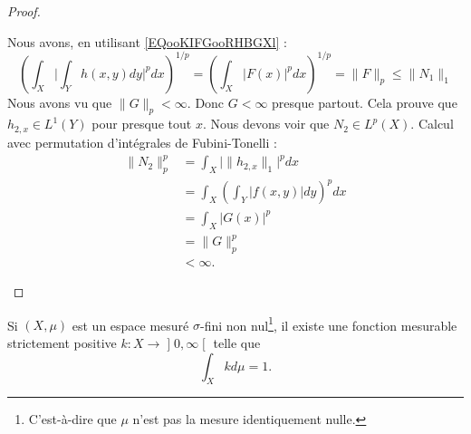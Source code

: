 \begin{proof}
\begin{subproof}
\begin{subproof}
			Nous avons, en utilisant \ref{EQooKIFGooRHBGXl} :
			\begin{equation}
				\left(  \int_X\big| \int_Yh(x,y)dy \big|^pdx   \right)^{1/p}=\left( \int_X| F(x) |^pdx \right)^{1/p}=\| F \|_p\leq \| N_1 \|_1
			\end{equation}
			Nous avons vu que \( \| G \|_p<\infty\). Donc \( G<\infty\) presque partout. Cela prouve que \( h_{2,x}\in L^1(Y)\) pour presque tout \( x\).
			Nous devons voir que \( N_2\in L^p(X)\). Calcul avec permutation d'intégrales de Fubini-Tonelli :
			\begin{subequations}
				\begin{align}
					\| N_2 \|_p^p & =\int_X\Big|  \| h_{2,x} \|_1 \Big|^pdx      \\
					              & =\int_X\left( \int_Y| f(x,y) |dy \right)^pdx \\
					              & =\int_X| G(x) |^p                            \\
					              & =\| G \|_p^p                                 \\
					              & <\infty.
				\end{align}
			\end{subequations}
		\end{subproof}
	\end{subproof}
\end{proof}


\begin{lemma}       \label{LEMooPSBWooGLggTe}
	Si \( (X,\mu)\) est un espace mesuré \( \sigma\)-fini non nul\footnote{C'est-à-dire que \( \mu\) n'est pas la mesure identiquement nulle.}, il existe une fonction mesurable strictement positive \( k\colon X\to \mathopen] 0 , \infty \mathclose[\) telle que
	\begin{equation}
		\int_Xkd\mu=1.
	\end{equation}
\end{lemma}

